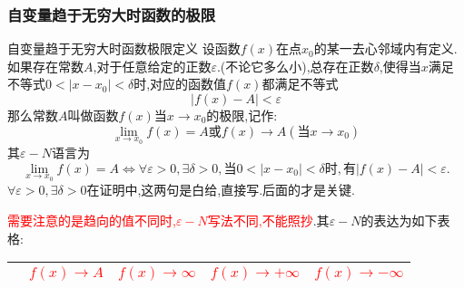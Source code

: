 \documentclass[8pt a4paper, oneside, UTF8]{ctexbook}
\begin{document}
\begin{sloppypar}
    \subsubsection{自变量趋于无穷大时函数的极限}
    \begin{defn}{自变量趋于无穷大时函数极限定义}{}
        设函数$f(x)$在点$x_0$的某一去心邻域内有定义.如果存在常数$A$,对于任意给定的正数$\varepsilon$.(不论它多么小),总存在正数$\delta$,使得当$x$满足不等式$0<|x-x_0|<\delta$时,对应的函数值$f(x)$都满足不等式
        $$
            |f(x)-A|<\varepsilon
        $$
        那么常数$A$叫做函数$f(x)$当$x \to x_0$的极限,记作:
        $$
            \lim_{x\to x_0}f(x)=A\text{或}f(x)\to A(\text{当}x\to x_0)
        $$
        其$\varepsilon-N$语言为
        $$
            \lim\limits_{x\to x_0}f(x)=A\Leftrightarrow\forall\varepsilon>0,\exists\delta>0,\text{当}0<|x-x_0|<\delta\text{时},\text{有}|f(x)-A|<\varepsilon.
        $$
        $\forall\varepsilon>0,\exists\delta>0$在证明中,这两句是白给,直接写.后面的才是关键.
    \end{defn}
    \textcolor{red}{需要注意的是趋向的值不同时,$\varepsilon -N$写法不同,不能照抄}.其$\varepsilon -N$的表达为如下表格:
    \begin{center}
        \begin{tabular}{|c|c|c|c|c|}
            \hline
                              & \textcolor{red}{$f(x)\to A$}                                                                                                                                & \textcolor{red}{$f(x)\to \infty$}                                                                                                       & \textcolor{red}{$f(x)\to +\infty$}                                                                                           & \textcolor{red}{$f(x)\to -\infty$}                                                                                               \\
            \hline

\end{tabular}
\end{center}
\end{sloppypar}
\end{document}
